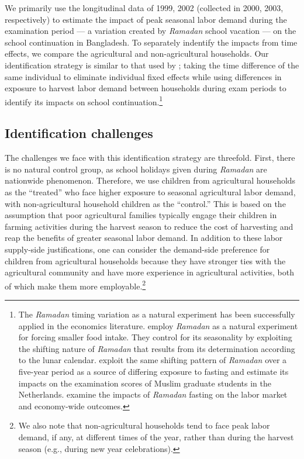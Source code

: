\documentclass[12pt,letterpaper]{article}
\newcommand{\0}{\ensuremath{\mbox{\boldmath $0$}}}
\begin{document}
We primarily use the longitudinal data of 1999, 2002 (collected in 2000, 2003, respectively) to estimate the impact of peak seasonal labor demand during the examination period --- a variation created by \textit{Ramadan} school vacation --- on the school continuation in Bangladesh. To separately indentify the impacts from time effects, we compare the agricultural and non-agricultural households. Our identification strategy is similar to that used by \citet{OosterbeekKlaauw2013}; taking the time difference of the same individual to eliminate individual fixed effects while using differences in exposure to harvest labor demand between households during exam periods to identify its impacts on school continuation.\footnote{The \textit{Ramadan} timing variation as a natural experiment has been successfully applied in the economics literature. \citet{AlmondMazumder2011} employ \textit{Ramadan} as a natural experiment for forcing smaller food intake. They control for its seasonality by exploiting the shifting nature of \textit{Ramadan} that results from its determination according to the lunar calendar. \citet{OosterbeekKlaauw2013} exploit the same shifting pattern of \textit{Ramadan} over a five-year period as a source of differing exposure to fasting and estimate its impacts on the examination scores of Muslim graduate students in the Netherlands. \citet{Campante2013} examine the impacts of \textit{Ramadan} fasting on the labor market and economy-wide outcomes. }

\subsection{Identification challenges \label{sec.identification_challange}}

The challenges we face with this identification strategy are threefold. First, there is no natural control group, as school holidays given during \textit{Ramadan} are nationwide phenomenon. Therefore, we use children from agricultural households as the ``treated'' who face higher exposure to seasonal agricultural labor demand, with non-agricultural household children as the ``control.'' This is based on the assumption that poor agricultural families typically engage their children in farming activities during the harvest season to reduce the cost of harvesting and reap the benefits of greater seasonal labor demand. In addition to these labor supply-side justifications, one can consider the demand-side preference for children from agricultural households because they have stronger ties with the agricultural community and have more experience in agricultural activities, both of which make them more employable.\footnote{We also note that non-agricultural households tend to face peak labor demand, if any, at different times of the year, rather than during the harvest season (e.g., during new year celebrations). }
\end{document}
